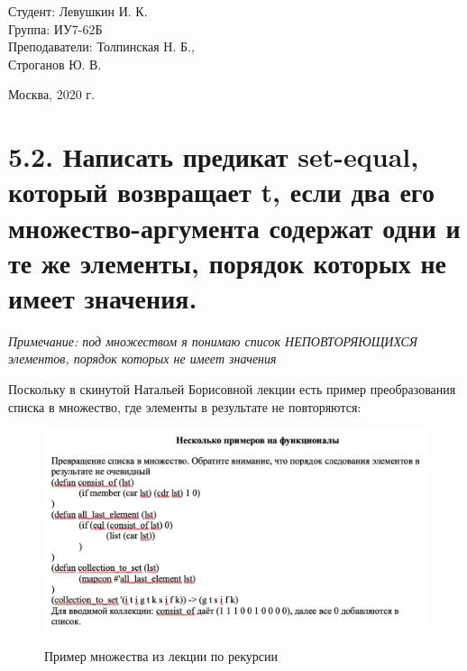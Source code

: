 \documentclass[a4paper,12pt]{article}
\begin{document}
	\vspace*{15mm} 	
	
	\large
	\begin{flushright}
		Студент: Левушкин И. К. \\
		Группа: ИУ7-62Б \\
		Преподаватели: Толпинская Н. Б., \\ Строганов Ю. В. \\
	\end{flushright}
	
	\vspace*{30mm}
	\begin{center}
		Москва, 2020 г.  
	\end{center}
	\thispagestyle{empty}
	
	
	\newpage
	
	\section*{5.2. Написать предикат set-equal, который возвращает t, если два его множество-аргумента содержат одни и те же элементы, порядок которых не имеет значения.
	 }
 
 	\textit{Примечание: под множеством я понимаю список НЕПОВТОРЯЮЩИХСЯ элементов, порядок которых не имеет значения}
 	
 	Поскольку в скинутой Натальей Борисовной лекции есть пример преобразования списка в множество, где элементы в результате не повторяются:
 	
 	\begin{figure}[h!]
 		\begin{center}
 			{\includegraphics[scale = 0.7]{set.png}}
 			\label{ris:set}
 		\end{center}
 		\caption{Пример множества из лекции по рекурсии}
 	\end{figure}
 	
\end{document}
